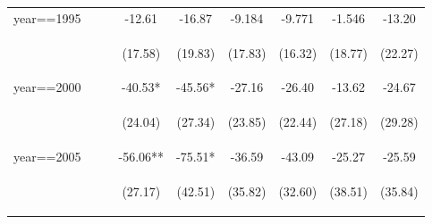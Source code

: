 \begin{landscape}
\begin{subtables}
\begin{table}[htpb!]
\begin{center}
\begin{tabular}{lcccccccc}
year==1995&&&-12.61&-16.87&-9.184&-9.771&-1.546&-13.20\\
&&&\begin{footnotesize}(17.58)\end{footnotesize}&\begin{footnotesize}(19.83)\end{footnotesize}&\begin{footnotesize}(17.83)\end{footnotesize}&\begin{footnotesize}(16.32)\end{footnotesize}&\begin{footnotesize}(18.77)\end{footnotesize}&\begin{footnotesize}(22.27)\end{footnotesize}\\
year==2000&&&-40.53*&-45.56*&-27.16&-26.40&-13.62&-24.67\\
&&&\begin{footnotesize}(24.04)\end{footnotesize}&\begin{footnotesize}(27.34)\end{footnotesize}&\begin{footnotesize}(23.85)\end{footnotesize}&\begin{footnotesize}(22.44)\end{footnotesize}&\begin{footnotesize}(27.18)\end{footnotesize}&\begin{footnotesize}(29.28)\end{footnotesize}\\
year==2005&&&-56.06**&-75.51*&-36.59&-43.09&-25.27&-25.59\\
&&&\begin{footnotesize}(27.17)\end{footnotesize}&\begin{footnotesize}(42.51)\end{footnotesize}&\begin{footnotesize}(35.82)\end{footnotesize}&\begin{footnotesize}(32.60)\end{footnotesize}&\begin{footnotesize}(38.51)\end{footnotesize}&\begin{footnotesize}(35.84)\end{footnotesize}\\

\end{tabular}
\end{center}
\end{table}
\end{subtables}
\end{landscape}
